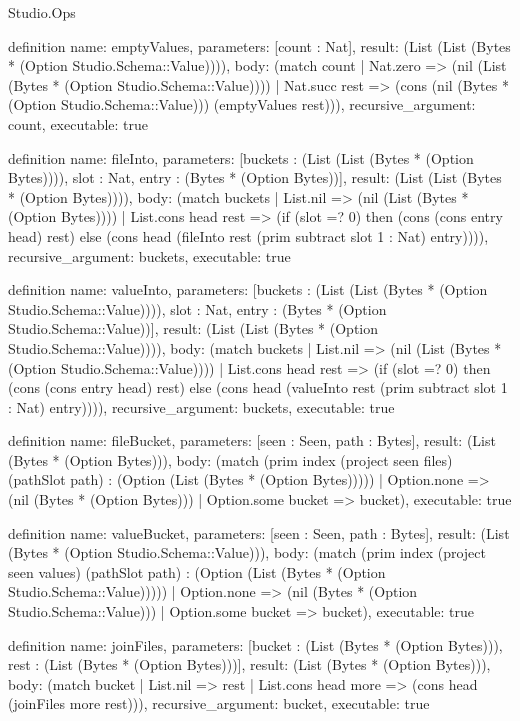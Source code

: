 \begin{lexlean}{Studio.Ops}
\begin{semanticmodule}
definition{
  name: emptyValues,
  parameters: [count : Nat],
  result: (List (List (Bytes * (Option Studio.Schema::Value)))),
  body: (match count
    | Nat.zero => (nil (List (Bytes * (Option Studio.Schema::Value))))
    | Nat.succ rest => (cons (nil (Bytes * (Option Studio.Schema::Value))) (emptyValues rest))),
  recursive_argument: count,
  executable: true
}

definition{
  name: fileInto,
  parameters: [buckets : (List (List (Bytes * (Option Bytes)))), slot : Nat, entry : (Bytes * (Option Bytes))],
  result: (List (List (Bytes * (Option Bytes)))),
  body: (match buckets
    | List.nil => (nil (List (Bytes * (Option Bytes))))
    | List.cons head rest => (if (slot =? 0) then (cons (cons entry head) rest) else (cons head (fileInto rest (prim subtract slot 1 : Nat) entry)))),
  recursive_argument: buckets,
  executable: true
}

definition{
  name: valueInto,
  parameters: [buckets : (List (List (Bytes * (Option Studio.Schema::Value)))), slot : Nat, entry : (Bytes * (Option Studio.Schema::Value))],
  result: (List (List (Bytes * (Option Studio.Schema::Value)))),
  body: (match buckets
    | List.nil => (nil (List (Bytes * (Option Studio.Schema::Value))))
    | List.cons head rest => (if (slot =? 0) then (cons (cons entry head) rest) else (cons head (valueInto rest (prim subtract slot 1 : Nat) entry)))),
  recursive_argument: buckets,
  executable: true
}

definition{
  name: fileBucket,
  parameters: [seen : Seen, path : Bytes],
  result: (List (Bytes * (Option Bytes))),
  body: (match (prim index (project seen files) (pathSlot path) : (Option (List (Bytes * (Option Bytes)))))
    | Option.none => (nil (Bytes * (Option Bytes)))
    | Option.some bucket => bucket),
  executable: true
}

definition{
  name: valueBucket,
  parameters: [seen : Seen, path : Bytes],
  result: (List (Bytes * (Option Studio.Schema::Value))),
  body: (match (prim index (project seen values) (pathSlot path) : (Option (List (Bytes * (Option Studio.Schema::Value)))))
    | Option.none => (nil (Bytes * (Option Studio.Schema::Value)))
    | Option.some bucket => bucket),
  executable: true
}


definition{
  name: joinFiles,
  parameters: [bucket : (List (Bytes * (Option Bytes))), rest : (List (Bytes * (Option Bytes)))],
  result: (List (Bytes * (Option Bytes))),
  body: (match bucket
    | List.nil => rest
    | List.cons head more => (cons head (joinFiles more rest))),
  recursive_argument: bucket,
  executable: true
}


\end{semanticmodule}
\end{lexlean}
